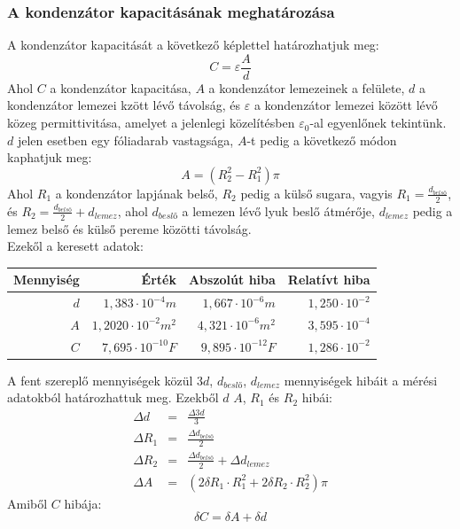 \documentclass[10pt,pdftex]{report}
\begin{document}
\subsubsection{A kondenzátor kapacitásának meghatározása}
A kondenzátor kapacitását a következő képlettel határozhatjuk meg:
\begin{equation}
    C=\varepsilon\frac{A}{d}
\end{equation}
Ahol $C$ a kondenzátor kapacitása, $A$ a kondenzátor lemezeinek a felülete, $d$ a kondenzátor lemezei kzött lévő távolság, és $\varepsilon$ a 
kondenzátor lemezei között lévő közeg permittivitása, amelyet a jelenlegi közelítésben $\varepsilon_0$-al egyenlőnek tekintünk.
$d$ jelen esetben egy fóliadarab vastagsága, $A$-t pedig a következő módon kaphatjuk meg:
\begin{equation}
    A=\left(R_{2}^{2}-R_{1}^{2}\right)\pi
\end{equation}
Ahol $R_1$ a kondenzátor lapjának belső, $R_2$ pedig a külső sugara, vagyis $R_1=\frac{d_{belső}}{2}$,\\ és 
$R_2=\frac{d_{belső}}{2}+d_{lemez}$, ahol $d_{beslő}$ a lemezen lévő lyuk beslő átmérője, $d_{lemez}$ pedig a lemez belső és külső 
pereme közötti távolság.\\ Ezekől a keresett adatok:
\begin{centering}
    \centering
    \begin{tabular}{|r|r|r|r|}
        \hline
        Mennyiség & Érték & Abszolút hiba & Relatívt hiba \\
        \hline
        $d$ & $1,383\cdot 10^{-4}m$ & $ 1,667\cdot 10^{-6}m$ & $1,250\cdot 10^{-2}$\\
        \hline
        $A$ & $1,2020\cdot 10^{-2}m^2$ & $4,321\cdot 10^{-6}m^2$ & $3,595\cdot 10^{-4}$\\
        \hline
        $C$ & $7,695\cdot 10^{-10}F$ & $9,895\cdot 10^{-12}F$ & $1,286\cdot 10^{-2}$\\
        \hline
    \end{tabular}
\end{centering}
\newline 
\newline
A fent szereplő mennyiségek közül $3d$, $d_{beslő}$, $d_{lemez}$ mennyiségek hibáit a mérési adatokból határozhattuk meg.
Ezekből $d$ $A$, $R_1$ és $R_2$ hibái:
\begin{eqnarray}
    \Delta d&=&  \frac{\Delta 3d}{3} \\
    \Delta R_1&=& \frac{\Delta d_{belső}}{2} \\
    \Delta R_2&=& \frac{\Delta d_{belső}}{2}+\Delta d_{lemez} \\
    \Delta A&=& \left(2\delta R_1 \cdot  R_{1}^{2} + 2\delta R_2 \cdot  R_{2}^{2}\right)\pi
\end{eqnarray} 
Amiből $C$ hibája:
\begin{equation}
    \delta C= \delta A + \delta d
\end{equation}
\end{document}
